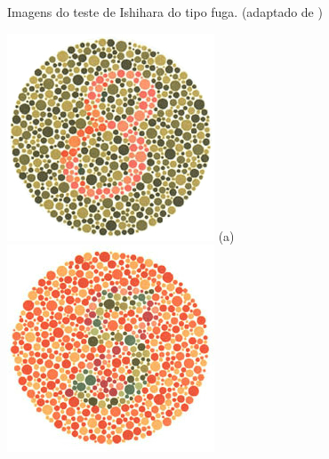 \documentclass[	12pt, Times, openright, twoside, a4paper, english, brazil]{abntex2}
\begin{document}
\begin{apendicesenv}
\begin{figure}[!htb]
\caption{Imagens do teste de Ishihara do tipo fuga. (adaptado de )}
\label{fig:apendiceFuga}

\end{figure}



\begin{figure}[!htb]
\centering
{\includegraphics[width=\linewidth]{ishihara-transformacao/plate2.jpg}}
(a)
\endminipage\hfill
{}
\centering
{\includegraphics[width=\linewidth]{ishihara-transformacao/plate6.jpg}}

\end{figure}
\end{apendicesenv}
\end{document}
